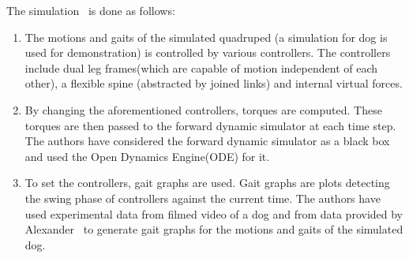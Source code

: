 \documentclass[a4paper,11pt,twocolumn]{article}
\begin{document}
The simulation~\cite{2011-TOG-quadruped-video} is done as follows:
\begin{enumerate}
	\item The motions and gaits of the simulated quadruped (a simulation for dog is used for demonstration) is controlled by various controllers. The controllers include dual leg frames(which are capable of motion independent of each other), a flexible spine (abstracted by joined links) and internal virtual forces.
	\item By changing the aforementioned controllers, torques are computed. These torques are then passed to the forward dynamic simulator at each time step. The authors have considered the forward dynamic simulator as a black box and used the Open Dynamics Engine(ODE) for it.
	\item To set the controllers, gait graphs are used. Gait graphs are plots detecting the swing phase of controllers against the current time. The authors have used experimental data from filmed video of a dog and from data provided by Alexander~\cite{gait_graph} to generate gait graphs for the motions and gaits of the simulated dog.
\end{enumerate}






\end{document}
